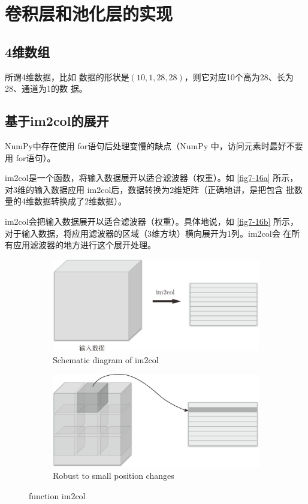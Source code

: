 \section{卷积层和池化层的实现}
\subsection{4维数组}
所谓4维数据，比如
数据的形状是$(10, 1, 28, 28)$，则它对应10个高为28、长为28、通道为1的数
据。
\subsection{基于im2col的展开}
NumPy中存在使用 for语句后处理变慢的缺点（NumPy 中，访问元素时最好不要用 for语句）。

im2col是一个函数，将输入数据展开以适合滤波器（权重）。如 \autoref{fig7-16a} 所示，
对3维的输入数据应用 im2col后，数据转换为2维矩阵（正确地讲，是把包含
批数量的4维数据转换成了2维数据）。

im2col会把输入数据展开以适合滤波器（权重）。具体地说，如 \autoref{fig7-16b} 所示，
对于输入数据，将应用滤波器的区域（3维方块）横向展开为1列。im2col会
在所有应用滤波器的地方进行这个展开处理。

\begin{figure}
    \centering
    \begin{subfigure}{.45\textwidth}
        \includegraphics[width=\textwidth]{Figures/Schematic diagram of im2col.png}
        \caption{Schematic diagram of im2col}
        \label{fig7-16a}
    \end{subfigure}
    \hfill
    \begin{subfigure}{.45\textwidth}
        \includegraphics[width=\textwidth]{Figures/Expand the filter's application area sequentially from the beginning to 1 column horizontally.png}
        \caption{Robust to small position changes}
        \label{fig7-16b}
    \end{subfigure}
    \caption{function im2col}
    \label{fig7-16}
\end{figure}

